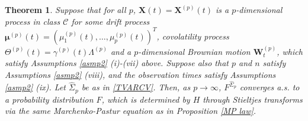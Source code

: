 \documentclass[a4paper,11pt]{book}
\theoremstyle{plain}
\newtheorem{thm}{Theorem}[chapter]%
\theoremstyle{definition}
\begin{document}
    \begin{thm} \label{Thm 2}
    	Suppose that for all $p$, $\mathbf{X}(t) = \mathbf{X}^{(p)}(t)$ is a $p$-dimensional process in class $\mathcal{C}$ for some drift process $\boldsymbol{\mu}^{(p)}(t) = (\mu_1^{(p)}(t), \dots , \mu_p^{(p)}(t))^T$, covolatility process $\Theta^{(p)}(t) = \gamma^{(p)}(t) \Lambda^{(p)}$ and a $p$-dimensional Brownian motion $\mathbf{W}_t^{(p)}$, which satisfy Assumptions \ref{asmp2} (i)-(vii) above. Suppose also that $p$ and $n$ satisfy Assumptions \ref{asmp2} (viii), and the observation times satisfy Assumptions \ref{asmp2} (ix). Let $\hat{\Sigma}_p$ be as in \eqref{TVARCV}. Then, as $p \rightarrow \infty$, $F^{\hat{\Sigma}_p}$ converges a.s. to a probability distribution $F$, which is determined by $H$ through Stieltjes transforms via the same Marchenko-Pastur equation as in Proposition \ref{MP law}.
    \end{thm}
\end{document}
